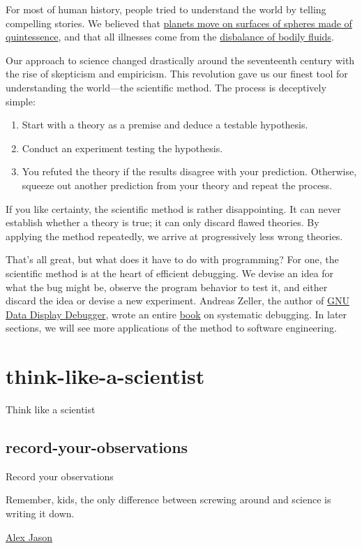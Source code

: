 \documentclass{article}
\begin{document}
For most of human history, people tried to understand the world by telling compelling stories.
We believed that \href{https://en.wikipedia.org/wiki/Celestial_spheres}{planets move on surfaces of spheres made of quintessence},
and that all illnesses come from the \href{https://en.wikipedia.org/wiki/Humorism}{disbalance of bodily fluids}.

Our approach to science changed drastically around the seventeenth century with the rise of skepticism and empiricism.
This revolution gave us our finest tool for understanding the world---the scientific method.
The process is deceptively simple:

\begin{enumerate}
\item Start with a theory as a premise and deduce a testable hypothesis.
\item Conduct an experiment testing the hypothesis.
\item You refuted the theory if the results disagree with your prediction.
  Otherwise, squeeze out another prediction from your theory and repeat the process.
\end{enumerate}

If you like certainty, the scientific method is rather disappointing.
It can never establish whether a theory is true;
it can only discard flawed theories.
By applying the method repeatedly, we arrive at progressively less wrong theories.

That's all great, but what does it have to do with programming?
For one, the scientific method is at the heart of efficient debugging.
We devise an idea for what the bug might be, observe the program behavior to test it, and either discard the idea or devise a new experiment.
Andreas Zeller, the author of \href{https://www.gnu.org/software/ddd/ddd.html}{GNU Data Display Debugger}, wrote an entire \href{https://www.whyprogramsfail.com/}{book} on systematic debugging.
In later sections, we will see more applications of the method to software engineering.

\section{think-like-a-scientist}{Think like a scientist}
\subsection{record-your-observations}{Record your observations}
\epigraph{
  Remember, kids, the only difference between screwing around and science is writing it down.
}{\href{https://www.reddit.com/r/mythbusters/comments/3wgqgv/the_origin_of_the_remember_kids_the_only/}{Alex Jason}}
\end{document}
